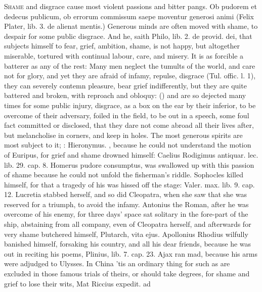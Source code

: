 {{\lettrine{S}{hame} and disgrace cause most violent passions and bitter pangs. Ob
pudorem et dedecus publicum, ob errorum commissum saepe moventur
generosi animi (Felix Plater, lib. 3. de alienat mentis.) Generous
minds are often moved with shame, to despair for some public disgrace.
And he, saith Philo, lib. 2. de provid. dei, that subjects
himself to fear, grief, ambition, shame, is not happy, but altogether
miserable, tortured with continual labour, care, and misery. It is as
forcible a batterer as any of the rest: Many men neglect the
tumults of the world, and care not for glory, and yet they are afraid
of infamy, repulse, disgrace (Tul. offic. l. 1), they can severely
contemn pleasure, bear grief indifferently, but they are quite
battered and broken, with reproach and obloquy: () and are so dejected many times for some
public injury, disgrace, as a box on the ear by their inferior, to be
overcome of their adversary, foiled in the field, to be out in a
speech, some foul fact committed or disclosed, \etc{} that they dare not
come abroad all their lives after, but melancholise in corners, and
keep in holes. The most generous spirits are most subject to it;
: Hieronymus. \Aristotle, because he
could not understand the motion of Euripus, for grief and shame drowned
himself: Caelius Rodigimus antiquar. lec. lib. 29. cap. 8. Homerus
pudore consumptus, was swallowed up with this passion of shame 
because he could not unfold the fisherman's riddle. Sophocles killed
himself, for that a tragedy of his was hissed off the stage:
Valer. max. lib. 9. cap. 12. Lucretia stabbed herself, and so did
Cleopatra, when she saw that she was reserved for a triumph, to
avoid the infamy. Antonius the Roman, after he was overcome of
his enemy, for three days' space sat solitary in the fore-part of the
ship, abstaining from all company, even of Cleopatra herself, and
afterwards for very shame butchered himself, Plutarch, vita ejus.
Apollonius Rhodius wilfully banished himself, forsaking his
country, and all his dear friends, because he was out in reciting his
poems, Plinius, lib. 7. cap. 23. Ajax ran mad, because his arms were
adjudged to Ulysses. In China 'tis an ordinary thing for such as are
excluded in those famous trials of theirs, or should take degrees, for
shame and grief to lose their wits, Mat Riccius expedit. ad
}}

